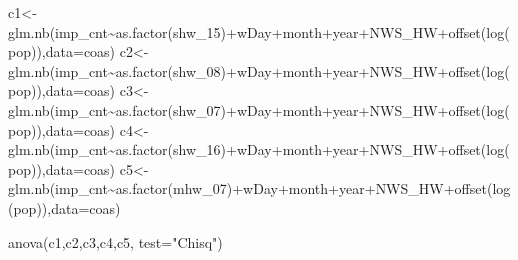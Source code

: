 \documentclass[
]{article}
\newenvironment{Shaded}{\begin{snugshade}}{\end{snugshade}}
\newcommand{\AttributeTok}[1]{\textcolor[rgb]{0.77,0.63,0.00}{#1}}
\newcommand{\FunctionTok}[1]{\textcolor[rgb]{0.00,0.00,0.00}{#1}}
\newcommand{\NormalTok}[1]{#1}
\newcommand{\OtherTok}[1]{\textcolor[rgb]{0.56,0.35,0.01}{#1}}
\newcommand{\SpecialCharTok}[1]{\textcolor[rgb]{0.00,0.00,0.00}{#1}}
\newcommand{\StringTok}[1]{\textcolor[rgb]{0.31,0.60,0.02}{#1}}
\begin{document}
\begin{Shaded}
\begin{Highlighting}[]
\NormalTok{c1}\OtherTok{\textless{}{-}} \FunctionTok{glm.nb}\NormalTok{(imp\_cnt}\SpecialCharTok{\textasciitilde{}}\FunctionTok{as.factor}\NormalTok{(shw\_15)}\SpecialCharTok{+}\NormalTok{wDay}\SpecialCharTok{+}\NormalTok{month}\SpecialCharTok{+}\NormalTok{year}\SpecialCharTok{+}\NormalTok{NWS\_HW}\SpecialCharTok{+}\FunctionTok{offset}\NormalTok{(}\FunctionTok{log}\NormalTok{(pop)),}\AttributeTok{data=}\NormalTok{coas)}
\NormalTok{c2}\OtherTok{\textless{}{-}} \FunctionTok{glm.nb}\NormalTok{(imp\_cnt}\SpecialCharTok{\textasciitilde{}}\FunctionTok{as.factor}\NormalTok{(shw\_08)}\SpecialCharTok{+}\NormalTok{wDay}\SpecialCharTok{+}\NormalTok{month}\SpecialCharTok{+}\NormalTok{year}\SpecialCharTok{+}\NormalTok{NWS\_HW}\SpecialCharTok{+}\FunctionTok{offset}\NormalTok{(}\FunctionTok{log}\NormalTok{(pop)),}\AttributeTok{data=}\NormalTok{coas)}
\NormalTok{c3}\OtherTok{\textless{}{-}} \FunctionTok{glm.nb}\NormalTok{(imp\_cnt}\SpecialCharTok{\textasciitilde{}}\FunctionTok{as.factor}\NormalTok{(shw\_07)}\SpecialCharTok{+}\NormalTok{wDay}\SpecialCharTok{+}\NormalTok{month}\SpecialCharTok{+}\NormalTok{year}\SpecialCharTok{+}\NormalTok{NWS\_HW}\SpecialCharTok{+}\FunctionTok{offset}\NormalTok{(}\FunctionTok{log}\NormalTok{(pop)),}\AttributeTok{data=}\NormalTok{coas)}
\NormalTok{c4}\OtherTok{\textless{}{-}} \FunctionTok{glm.nb}\NormalTok{(imp\_cnt}\SpecialCharTok{\textasciitilde{}}\FunctionTok{as.factor}\NormalTok{(shw\_16)}\SpecialCharTok{+}\NormalTok{wDay}\SpecialCharTok{+}\NormalTok{month}\SpecialCharTok{+}\NormalTok{year}\SpecialCharTok{+}\NormalTok{NWS\_HW}\SpecialCharTok{+}\FunctionTok{offset}\NormalTok{(}\FunctionTok{log}\NormalTok{(pop)),}\AttributeTok{data=}\NormalTok{coas)}
\NormalTok{c5}\OtherTok{\textless{}{-}} \FunctionTok{glm.nb}\NormalTok{(imp\_cnt}\SpecialCharTok{\textasciitilde{}}\FunctionTok{as.factor}\NormalTok{(mhw\_07)}\SpecialCharTok{+}\NormalTok{wDay}\SpecialCharTok{+}\NormalTok{month}\SpecialCharTok{+}\NormalTok{year}\SpecialCharTok{+}\NormalTok{NWS\_HW}\SpecialCharTok{+}\FunctionTok{offset}\NormalTok{(}\FunctionTok{log}\NormalTok{(pop)),}\AttributeTok{data=}\NormalTok{coas)}

\FunctionTok{anova}\NormalTok{(c1,c2,c3,c4,c5, }\AttributeTok{test=}\StringTok{"Chisq"}\NormalTok{)}
\end{Highlighting}
\end{Shaded}
\end{document}
